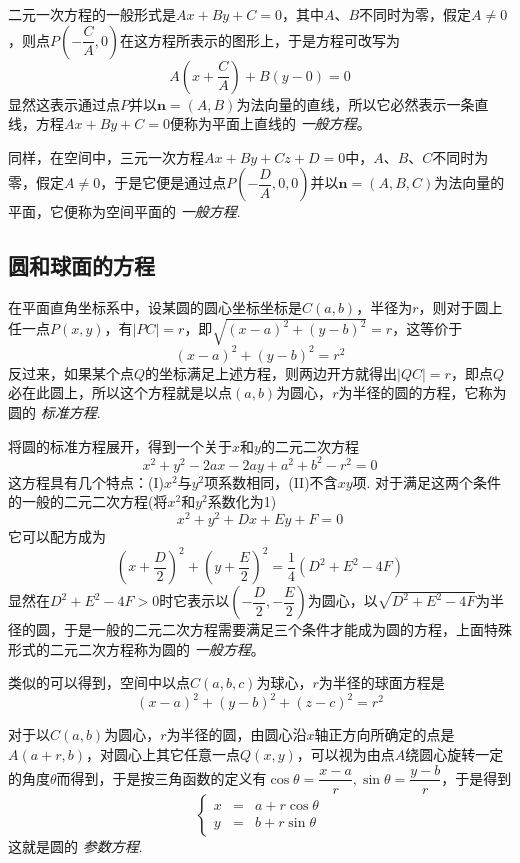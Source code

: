 二元一次方程的一般形式是$Ax+By+C=0$，其中$A$、$B$不同时为零，假定$A \neq 0$，则点$P(-\dfrac{C}{A},0)$在这方程所表示的图形上，于是方程可改写为
\[ A(x+\frac{C}{A})+B(y-0)=0 \]
显然这表示通过点$P$并以$\bm{n}=(A,B)$为法向量的直线，所以它必然表示一条直线，方程$Ax+By+C=0$便称为平面上直线的 \emph{一般方程}。

同样，在空间中，三元一次方程$Ax+By+Cz+D=0$中，$A$、$B$、$C$不同时为零，假定$A \neq 0$，于是它便是通过点$P(-\dfrac{D}{A},0,0)$并以$\bm{n}=(A,B,C)$为法向量的平面，它便称为空间平面的 \emph{一般方程}.

\subsection{圆和球面的方程}
\label{sec:equation-of-circle-and-ball}

在平面直角坐标系中，设某圆的圆心坐标坐标是$C(a,b)$，半径为$r$，则对于圆上任一点$P(x,y)$，有$|PC|=r$，即$\sqrt{(x-a)^2+(y-b)^2}=r$，这等价于
\[ (x-a)^2+(y-b)^2=r^2 \]
反过来，如果某个点$Q$的坐标满足上述方程，则两边开方就得出$|QC|=r$，即点$Q$必在此圆上，所以这个方程就是以点$(a,b)$为圆心，$r$为半径的圆的方程，它称为圆的 \emph{标准方程}.

将圆的标准方程展开，得到一个关于$x$和$y$的二元二次方程
\[ x^2+y^2-2ax-2ay+a^2+b^2-r^2=0 \]
这方程具有几个特点：(I)$x^2$与$y^2$项系数相同，(II)不含$xy$项. 对于满足这两个条件的一般的二元二次方程(将$x^2$和$y^2$系数化为1)
\[ x^2+y^2+Dx+Ey+F=0 \]
它可以配方成为
\[ \left( x+\frac{D}{2} \right)^2 + \left( y+\frac{E}{2} \right)^2 = \frac{1}{4}(D^2+E^2-4F) \]
显然在$D^2+E^2-4F>0$时它表示以$\left( -\dfrac{D}{2}, -\dfrac{E}{2} \right)$为圆心，以$\sqrt{D^2+E^2-4F}$为半径的圆，于是一般的二元二次方程需要满足三个条件才能成为圆的方程，上面特殊形式的二元二次方程称为圆的 \emph{一般方程}。

类似的可以得到，空间中以点$C(a,b,c)$为球心，$r$为半径的球面方程是
\[ (x-a)^2+(y-b)^2+(z-c)^2=r^2 \]

对于以$C(a,b)$为圆心，$r$为半径的圆，由圆心沿$x$轴正方向所确定的点是$A(a+r,b)$，对圆心上其它任意一点$Q(x,y)$，可以视为由点$A$绕圆心旋转一定的角度$\theta$而得到，于是按三角函数的定义有$\cos{\theta}=\dfrac{x-a}{r},\sin{\theta}=\dfrac{y-b}{r}$，于是得到
\[ \left\{
    \begin{array}{lll}
      x & = & a + r \cos{\theta} \\
      y & = & b + r \sin{\theta} 
    \end{array}
  \right. \]
这就是圆的 \emph{参数方程}.

